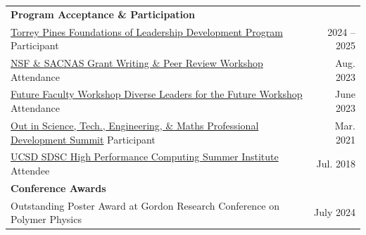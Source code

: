 \documentclass[letterpaper,11pt]{article}
\begin{document}
\begin{longtable}{@{}p{}r@{}}
  \multicolumn{2}{l}{\hspace{-3mm} \bf{Program Acceptance \& Participation}} 	                                                                                                                                                                                        \\ [5pt]
  \hspace{3mm} \href{http://sbpleaders.org/SitePages/Foundations.aspx}{Torrey Pines Foundations of Leadership Development Program} Participant                                                                                                           & 2024 -- 2025 \\ [4pt]
  \hspace{3mm} \href{https://www.sacnas.org/professional-programs#:~:text=NSF\%20\%26\%20SACNAS\%20GRANT\%20WRITING\%20AND\%20PEER\%20REVIEW\%20WORKSHOP}{NSF \& SACNAS Grant Writing \& Peer Review Workshop} Attendance                                & Aug. 2023    \\ [4pt]
  \hspace{3mm} \href{https://sites.udel.edu/future-faculty-workshop/}{Future Faculty Workshop Diverse Leaders for the Future Workshop} Attendance                                                                                                        & June 2023    \\ [4pt]
  \hspace{3mm} \href{https://ostem.org/page/professional-development-summit}{Out in Science, Tech., Engineering, \& Maths Professional Development Summit} Participant                                                                                   & Mar. 2021    \\ [4pt]
  \hspace{3mm} \href{https://www.sdsc.edu/education_and_training/summer_institute.html}{UCSD SDSC High Performance Computing Summer Institute} Attendee                                                                                                  & Jul. 2018    \\ [10pt]
  \multicolumn{2}{l}{\hspace{-3mm} \bf{Conference Awards}} 	                                                                                                                                                                                                        \\ [5pt]
  \hspace{3mm} Outstanding Poster Award at Gordon Research Conference on Polymer Physics                                                                                                                                                                 & July 2024    \\ [4pt]

\end{longtable}
\end{document}
